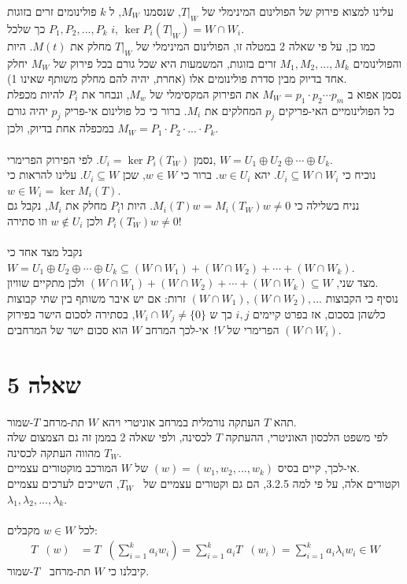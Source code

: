 \documentclass{article}
\DeclareMathOperator{\adj}{^\ast}
\begin{document}
עלינו למצוא פירוק של הפולינום המינימלי של $T|_W$, שנסמנו $M_W$, ל $k$ פולינומים זרים בזוגות $P_1, P_2, ..., P_k$ כך שלכל $i$, $\ker P_i(T|_W)=W\cap W_i$. \\
כמו כן, על פי שאלה 2 במטלה זו, הפולינום המינימלי של $T|_W$ מחלק את $M(t)$. היות והפולינומים $M_1, M_2, ..., M_k$ זרים בזוגות, המשמעות היא שכל גורם בכל פירוק של $M_W$ יחלק אחד בדיוק מבין סדרת פולינומים אלו (אחרת, יהיה להם מחלק משותף שאינו 1). \\
נסמן אפוא ב $M_W=p_1\cdot p_2\cdots p_m$ את הפירוק המקסימלי של $M_w$, ונבחר את $P_i$ להיות מכפלת כל הפולינומיים האי-פריקים $p_j$ המחלקים את $M_i$.
ברור כי כל פולינום אי-פריק $p_j$ יהיה גורם במכפלה אחת בדיוק, ולכן $M_W=P_1\cdot P_2\cdot ... \cdot P_k$. \\\\
נסמן $U_i=\ker P_i(T_W)$. לפי הפירוק הפרימרי, $W=U_1\oplus U_2\oplus\cdots\oplus U_k$. \\
נוכיח כי $U_i\subseteq W\cap W_i$. יהא $w\in U_i$. ברור כי $w\in W$, שכן $U_i\subseteq W$. עלינו להראות כי $w\in W_i=\ker M_i(T)$. \\
נניח בשלילה כי $M_i(T)w=M_i(T_W)w\ne 0$. היות ו$P_i$ מחלק את $M_i$, נקבל גם $P_i(T_W)w\ne 0$ ולכן $w\notin U_i$ וזו סתירה! \\\\
נקבל מצד אחד כי $W=U_1\oplus U_2\oplus\cdots\oplus U_k\subseteq (W\cap W_1)+(W\cap W_2)+\cdots + (W\cap W_k)$. \\
מצד שני, $(W\cap W_1)+(W\cap W_2)+\cdots+(W\cap W_k)\subseteq W$ ולכן מתקיים שוויון. \\
נוסיף כי הקבוצות $(W\cap W_1),(W\cap W_2), ...$ זרות: אם יש איבר משותף בין שתי קבוצות כלשהן בסכום, אז בפרט קיימים $i,j$ כך ש $W_i\cap W_j\ne \{0\}$, בסתירה לסכום הישר בפירוק הפרימרי של $V$!\
אי-לכך המרחב $W$ הוא סכום ישר של המרחבים $(W\cap W_i)$.

\section*{שאלה 5}

תהא $T$ העתקה נורמלית במרחב אוניטרי ויהא $W$ תת-מרחב $T$-שמור. \\
לפי משפט הלכסון האוניטרי, ההעתקה $T$ לכסינה, ולפי שאלה 2 בממן זה גם הצמצום שלה $T_W$ מהווה העתקה לכסינה. \\
אי-לכך, קיים בסיס $(w)=(w_1, w_2, ..., w_k)$ של $W$ המורכב מוקטורים עצמיים. \\
וקטורים אלה, על פי למה 3.2.5, הם גם וקטורים עצמיים של $T_W\adj$, השייכים לערכים עצמיים $\lambda_1, \lambda_2, ..., \lambda_k$.\\\\
לכל $w\in W$ מקבלים:
\begin{align*}
    T\adj(w) & =
    T\adj ( \sum_{i=1}^k a_i w_i ) =
    \sum_{i=1}^k a_i T\adj (w_i) =
    \sum_{i=1}^k a_i \lambda_i w_i \in W
\end{align*}
קיבלנו כי $W$ תת-מרחב $T\adj$-שמור.
\end{document}
